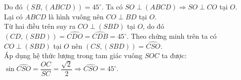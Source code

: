 \begin{ex}
{\begin{itemchoice}
			Do đó $(SB, (ABCD))=45^\circ$. 
			\itemch 
			 Ta có $SO\perp (ABCD) \Rightarrow SO\perp CO$ tại $O$. \\
			Lại có $ABCD$ là hình vuông nên $CO\perp BD$ tại $O$.  \\
			Từ  hai điều trên suy ra $CO\perp (SBD)$ tại $O$, do đó $(CD, (SBD))=\widehat{CDO}=\widehat{CDB}=45^\circ$.
			 \itemch
			 Theo chứng minh trên ta có $CO\perp (SBD)$ tại $O$ nên $(CS, (SBD))=\widehat{CSO}$. \\
			Áp dụng hệ thức lượng  trong tam giác vuông $SOC$ ta được: \\
			$\sin \widehat{CSO}=\dfrac{OC}{SC}=\dfrac{\sqrt{2}}{2}  \Rightarrow \widehat{CSO}=45^\circ$.
		\end{itemchoice}
	 }
\end{ex}

